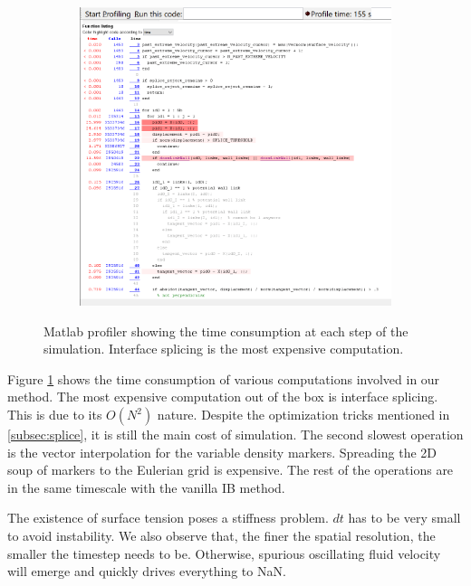 \documentclass{jfm}
\begin{document}
\begin{figure}
\begin{subfigure}{.36\textwidth}
        \end{subfigure}
        \begin{subfigure}{.64\textwidth}
        \centering
        \includegraphics[width=\textwidth,trim={0mm 0mm 0mm 0mm},clip]{figs/time_profiling/code.png}
        \end{subfigure}
        \caption{
            Matlab profiler showing the time consumption at each step of the simulation. Interface splicing is the most expensive computation. 
        }
        \label{fig:computation}
    \end{figure}

    Figure \ref{fig:computation} shows the time consumption of various computations involved in our method. The most expensive computation out of the box is interface splicing. This is due to its $O(N^2)$ nature. Despite the optimization tricks mentioned in \ref{subsec:splice}, it is still the main cost of simulation. The second slowest operation is the vector interpolation for the variable density \citep{IBM_variable_density} markers. Spreading the 2D soup of markers to the Eulerian grid is expensive. The rest of the operations are in the same timescale with the vanilla IB method. 
    
    The existence of surface tension poses a stiffness problem. $dt$ has to be very small to avoid instability. We also observe that, the finer the spatial resolution, the smaller the timestep needs to be. Otherwise, spurious oscillating fluid velocity will emerge and quickly drives everything to NaN. 
    
\end{document}
